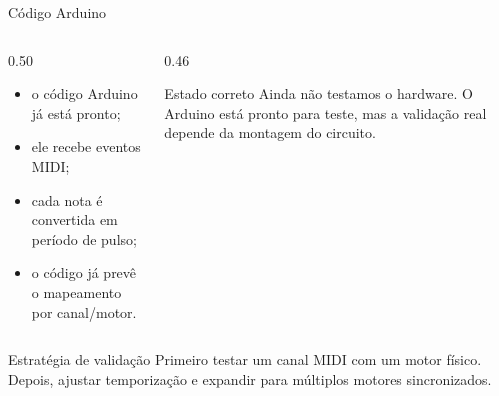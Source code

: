 \documentclass{beamer}
\begin{document}
\begin{frame}{Código Arduino}
    \begin{columns}[T,onlytextwidth]
        \begin{column}{0.50\textwidth}
            \begin{itemize}
                \item o código Arduino já está pronto;
                \item ele recebe eventos MIDI;
                \item cada nota é convertida em período de pulso;
                \item o código já prevê o mapeamento por canal/motor.
            \end{itemize}
        \end{column}
        \begin{column}{0.46\textwidth}
            \begin{alertblock}{Estado correto}
                Ainda não testamos o hardware. O Arduino está pronto para teste,
                mas a validação real depende da montagem do circuito.
            \end{alertblock}
        \end{column}
    \end{columns}

    \vspace{0.2cm}

    \begin{block}{Estratégia de validação}
        Primeiro testar um canal MIDI com um motor físico. Depois, ajustar
        temporização e expandir para múltiplos motores sincronizados.
    \end{block}
\end{frame}
\end{document}
